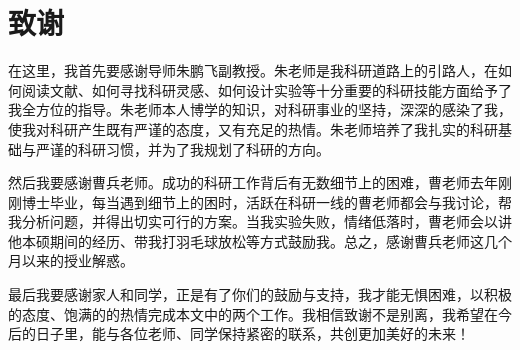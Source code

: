 \chapter*{致\qquad 谢}

在这里，我首先要感谢导师朱鹏飞副教授。朱老师是我科研道路上的引路人，在如何阅读文献、如何寻找科研灵感、如何设计实验等十分重要的科研技能方面给予了我全方位的指导。朱老师本人博学的知识，对科研事业的坚持，深深的感染了我，使我对科研产生既有严谨的态度，又有充足的热情。朱老师培养了我扎实的科研基础与严谨的科研习惯，并为了我规划了科研的方向。

然后我要感谢曹兵老师。成功的科研工作背后有无数细节上的困难，曹老师去年刚刚博士毕业，每当遇到细节上的困时，活跃在科研一线的曹老师都会与我讨论，帮我分析问题，并得出切实可行的方案。当我实验失败，情绪低落时，曹老师会以讲他本硕期间的经历、带我打羽毛球放松等方式鼓励我。总之，感谢曹兵老师这几个月以来的授业解惑。

最后我要感谢家人和同学，正是有了你们的鼓励与支持，我才能无惧困难，以积极的态度、饱满的的热情完成本文中的两个工作。我相信致谢不是别离，我希望在今后的日子里，能与各位老师、同学保持紧密的联系，共创更加美好的未来！
